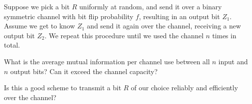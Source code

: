 \documentclass[a4paper,10pt,landscape,twocolumn]{scrartcl}
\begin{document}
\begin{exercise}
Suppose we pick a bit $R$ uniformly at random, and send it over a binary symmetric channel with bit flip probability $f$, resulting in an output bit $Z_1$. Assume we get to know $Z_1$ and send it again over the channel, receiving a new output bit $Z_2$. We repeat this procedure until we used the channel $n$ times in total.

\begin{subex}[(3pt)]
What is the average mutual information per channel use between all $n$ input and $n$ output bits? Can it exceed the channel capacity?
\end{subex}

\begin{subex}[(1pt)]
Is this a good scheme to transmit a bit $R$ of our choice reliably and efficiently over the channel?
\end{subex}

\end{exercise}
\end{document}
